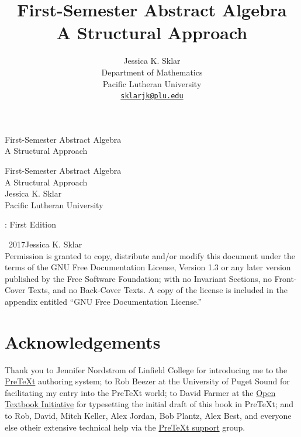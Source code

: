 \documentclass[10pt,openany,oneside]{book}
\title{First-Semester Abstract Algebra\\
{\large A Structural Approach}}
\author{Jessica K. Sklar\\
Department of Mathematics\\
Pacific Lutheran University\\
\href{mailto:sklarjk@plu.edu}{\nolinkurl{sklarjk@plu.edu}}
}
\date{}
\theoremstyle{plain}
\theoremstyle{definition}
\theoremstyle{definition}
\theoremstyle{definition}
\theoremstyle{definition}
\numberwithin{equation}{section}
\begin{document}
\frontmatter
\thispagestyle{empty}
{\centering
\vspace*{0.28\textheight}
{\Huge First-Semester Abstract Algebra}\\[2\baselineskip]
{\LARGE A Structural Approach}\\
}
\clearpage
\thispagestyle{empty}
\null%
\clearpage
\thispagestyle{empty}
{\centering
\vspace*{0.14\textheight}
{\Huge First-Semester Abstract Algebra}\\[\baselineskip]
{\LARGE A Structural Approach}\\[3\baselineskip]
{\Large Jessica K. Sklar}\\[0.5\baselineskip]
{\Large Pacific Lutheran University}\\}
\clearpage
\thispagestyle{empty}
: First Edition\par\medskip
\noindent\textcopyright\ 2017\quad{}Jessica K. Sklar\\[0.5\baselineskip]
Permission is granted to copy, distribute and/or modify this document under the terms of the GNU Free Documentation License, Version 1.3 or any later version published by the Free Software Foundation; with no Invariant Sections, no Front-Cover Texts, and no Back-Cover Texts.  A copy of the license is included in the appendix entitled ``GNU Free Documentation License.''\par\medskip
{}
\null\clearpage
\chapter*{Acknowledgements}\label{acknowledgement-1}
Thank you to Jennifer Nordstrom of Linfield College for introducing me to the \href{http://mathbook.pugetsound.edu}{PreTeXt} authoring system; to Rob Beezer at the University of Puget Sound for facilitating my entry into the PreTeXt world;  to David Farmer at the \href{https://aimath.org/textbooks/}{Open Textbook Initiative} for typesetting the initial draft of this book in PreTeXt; and to Rob, David, Mitch Keller, Alex Jordan, Bob Plantz, Alex Best, and everyone else otheir extensive technical help via the \href{https://groups.google.com/forum/?fromgroups\#!forum/pretext-support}{PreTeXt support} group.%
\end{document}
